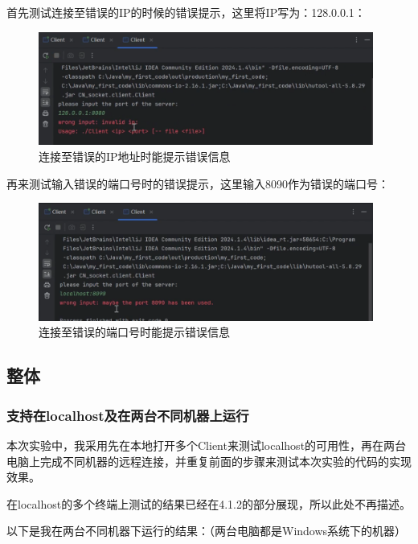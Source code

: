 \documentclass{article}
\begin{document}
	首先测试连接至错误的IP的时候的错误提示，这里将IP写为：128.0.0.1：
	
	\begin{figure}[H]
		\centering
		\includegraphics[width=11cm]{./images/6.连接至错误的IP地址时能提示错误信息.png}
		\caption{连接至错误的IP地址时能提示错误信息}
	\end{figure}
	
	再来测试输入错误的端口号时的错误提示，这里输入8090作为错误的端口号：
	
	\begin{figure}[H]
		\centering
		\includegraphics[width=11cm]{./images/6.连接至错误的端口号时能提示错误信息.png}
		\caption{连接至错误的端口号时能提示错误信息}
	\end{figure}
	
	\subsection{整体}
	
	\subsubsection{支持在localhost及在两台不同机器上运行}
	
	本次实验中，我采用先在本地打开多个Client来测试localhost的可用性，再在两台电脑上完成不同机器的远程连接，并重复前面的步骤来测试本次实验的代码的实现效果。
	
	在localhost的多个终端上测试的结果已经在4.1.2的部分展现，所以此处不再描述。
	
	\vspace{12pt}
	
	以下是我在两台不同机器下运行的结果：（两台电脑都是Windows系统下的机器）
	
\end{document}
